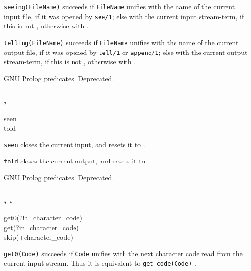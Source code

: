 \Description

\texttt{seeing(FileName)} succeeds if \texttt{FileName} unifies
with the name of the current input file, if it was opened by
\texttt{see/1}; else with the current input stream-term, if this is not
, otherwise with
.

\texttt{telling(FileName)} succeeds if \texttt{FileName} unifies with the
name of the current output file, if it was opened by \texttt{tell/1} or
\texttt{append/1}; else with the current output stream-term, if this is not
, otherwise with .

\PlErrorsNone

\Portability

GNU Prolog predicates. Deprecated.

\subsubsection{,
               }

\begin{TemplatesOneCol}
seen\\
told

\end{TemplatesOneCol}

\Description

\texttt{seen} closes the current input, and resets it to
.

\texttt{told} closes the current output, and resets it to
.

\PlErrorsNone

\Portability

GNU Prolog predicates. Deprecated.

\subsubsection{,
               ,
               }

\begin{TemplatesOneCol}
get0(?in\_character\_code)\\
get(?in\_character\_code)\\
skip(+character\_code)

\end{TemplatesOneCol}

\Description

\texttt{get0(Code)} succeeds if \texttt{Code} unifies with the next
character code read from the current input stream. Thus it is equivalent to
\texttt{get\_code(Code)} .

